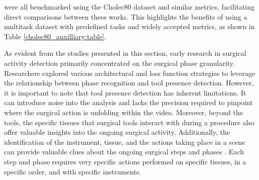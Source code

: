 \citet{EndoNet,multi_task_recurrent_conv,multitask_connectionism,tecno,Sanchez-Matilla2022_data_centric} were all benchmarked using the Cholec80 dataset and similar metrics, facilitating direct comparisons between these works. This highlights the benefits of using a multitask dataset with predefined tasks and widely accepted metrics, as shown in Table \ref{cholec80_auxilliary:table}.

\begin{table}[htb!]
\caption{Phase recognition and instrument detection results of various multitask learning methods on Cholec80. Results are retrieved from references. The mean of the published results are reported.} \label{cholec80_auxilliary:table}
\end{table}

As evident from the studies presented in this section, early research in surgical activity detection primarily concentrated on the surgical phase granularity. Researchers explored various architectural and loss function strategies to leverage the relationship between phase recognition and tool presence detection. However, it is important to note that tool presence detection has inherent limitations. It can introduce noise into the analysis and lacks the precision required to pinpoint where the surgical action is unfolding within the video.
Moreover, beyond the tools, the specific tissues that surgical tools interact with during a procedure also offer valuable insights into the ongoing surgical activity. 
Additionally, the identification of the instrument, tissue, and the actions taking place in a scene can provide valuable clues about the ongoing surgical steps and phases \citep{holistic_scene_understanding}. 
Each step and phase requires very specific actions performed on specific tissues, in a specific order, and with specific instruments.   



